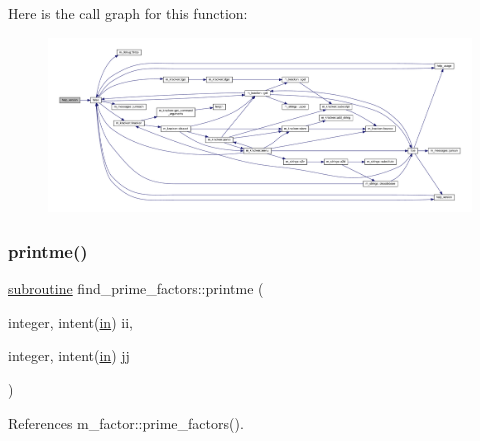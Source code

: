 Here is the call graph for this function\+:
\nopagebreak
\begin{figure}[H]
\begin{center}
\leavevmode
\includegraphics[width=350pt]{factors_8f90_a39c21619b08a3c22f19e2306efd7f766_cgraph}
\end{center}
\end{figure}
\mbox{\label{factors_8f90_a96d1688b4d46c7b9dfe3e34cf97426a6}} 
\subsubsection{\texorpdfstring{printme()}{printme()}}
{\footnotesize\ttfamily \hyperlink{M__stopwatch_83_8txt_acfbcff50169d691ff02d4a123ed70482}{subroutine} find\+\_\+prime\+\_\+factors\+::printme (\begin{DoxyParamCaption}\item[{integer, intent(\hyperlink{M__journal_83_8txt_afce72651d1eed785a2132bee863b2f38}{in})}]{ii,  }\item[{integer, intent(\hyperlink{M__journal_83_8txt_afce72651d1eed785a2132bee863b2f38}{in})}]{jj }\end{DoxyParamCaption})}



References m\+\_\+factor\+::prime\+\_\+factors().

